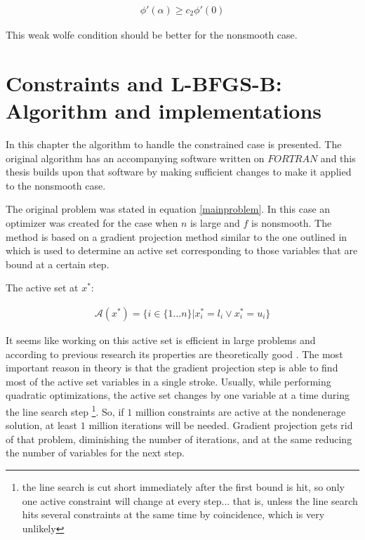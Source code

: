 \begin{equation} \label{weakWolfe}
  \begin{aligned}
    \phi'(\alpha) \geq c_2\phi'(0)
  \end{aligned}
\end{equation}

This weak wolfe condition should be better for the nonsmooth case.

\chapter{Constraints and L-BFGS-B: Algorithm and implementations}
\label{ChapterConstraints} %

In this chapter the algorithm to handle the constrained case is presented. The original algorithm \citep{mainpaper} has an accompanying software written on $FORTRAN$ and this thesis builds upon that software by making sufficient changes to make it applied to the nonsmooth case.

The original problem was stated in equation \ref{mainproblem}. In this case an optimizer was created for the case when $n$ is large and $f$ is nonsmooth. The method is based on a gradient projection method similar to the one outlined in \citep{gradproj1, gradproj2} which is used to determine an active set corresponding to those variables that are bound at a certain step. 

The active set at $x^*$:

\begin{equation}
  \begin{aligned}
    \mathcal{A}(x^*) = \{ i \in \{1 \ldots n\} |  x^*_i = l_i \vee  x^*_i = u_i\}
  \end{aligned}
\end{equation}

It seems like working on this active set  is efficient in large problems and according to previous research its properties are theoretically good \citep{nocedal}. The most important reason in theory is that the gradient projection step is able to find most of the active set variables in a single stroke. Usually, while performing quadratic optimizations, the active set changes by one variable at a time during the line search step \footnote{the line search is cut short immediately after the first bound is hit, so only one active constraint will change at every step... that is, unless the line search hits several constraints at the same time by coincidence, which is very unlikely}. So, if $1$ million constraints are active at the nondenerage solution, at least $1$ million iterations will be needed.  Gradient projection gets rid of that problem, diminishing the number of iterations, and at the same reducing the number of variables for the next step.


